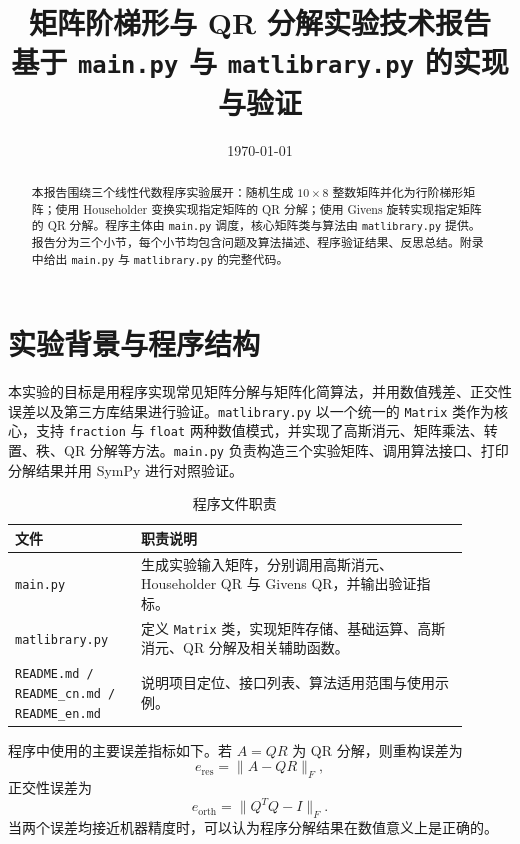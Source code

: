 \documentclass[UTF8,zihao=-4]{ctexart}
\title{\vspace{-1.2cm}\textbf{矩阵阶梯形与 QR 分解实验技术报告}\\[0.4em]
\large 基于 \texttt{main.py} 与 \texttt{matlibrary.py} 的实现与验证}
\author{ }
\date{\today}
\begin{document}
\maketitle
\thispagestyle{fancy}

\begin{abstract}
本报告围绕三个线性代数程序实验展开：随机生成 $10\times 8$ 整数矩阵并化为行阶梯形矩阵；使用 Householder 变换实现指定矩阵的 QR 分解；使用 Givens 旋转实现指定矩阵的 QR 分解。程序主体由 \texttt{main.py} 调度，核心矩阵类与算法由 \texttt{matlibrary.py} 提供。报告分为三个小节，每个小节均包含问题及算法描述、程序验证结果、反思总结。附录中给出 \texttt{main.py} 与 \texttt{matlibrary.py} 的完整代码。
\end{abstract}

\tableofcontents
\newpage

\section{实验背景与程序结构}

本实验的目标是用程序实现常见矩阵分解与矩阵化简算法，并用数值残差、正交性误差以及第三方库结果进行验证。\texttt{matlibrary.py} 以一个统一的 \texttt{Matrix} 类作为核心，支持 \texttt{fraction} 与 \texttt{float} 两种数值模式，并实现了高斯消元、矩阵乘法、转置、秩、QR 分解等方法。\texttt{main.py} 负责构造三个实验矩阵、调用算法接口、打印分解结果并用 SymPy 进行对照验证。

\begin{table}[H]
\centering
\caption{程序文件职责}
\begin{tabular}{p{0.25\linewidth}p{0.65\linewidth}}
\toprule
文件 & 职责说明 \\
\midrule
\texttt{main.py} & 生成实验输入矩阵，分别调用高斯消元、Householder QR 与 Givens QR，并输出验证指标。\\
\texttt{matlibrary.py} & 定义 \texttt{Matrix} 类，实现矩阵存储、基础运算、高斯消元、QR 分解及相关辅助函数。\\
\texttt{README.md / README\_cn.md / README\_en.md} & 说明项目定位、接口列表、算法适用范围与使用示例。\\
\bottomrule
\end{tabular}
\end{table}

程序中使用的主要误差指标如下。若 $A=QR$ 为 QR 分解，则重构误差为
\[
    e_{\mathrm{res}}=\|A-QR\|_F,
\]
正交性误差为
\[
    e_{\mathrm{orth}}=\|Q^TQ-I\|_F.
\]
当两个误差均接近机器精度时，可以认为程序分解结果在数值意义上是正确的。
\end{document}
